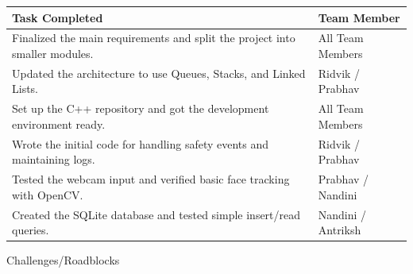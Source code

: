 \documentclass[12pt,a4paper]{article}
\newcommand{\sectiontitle}[1]{%
    {\color{GEUBlue}\fontsize{18}{22}\selectfont #1}%
}
\begin{document}
\noindent
\begin{tabularx}{\textwidth}{
    |>{\raggedright\arraybackslash}p{}
    |>{\raggedright\arraybackslash}X|
}
\hline
\textbf{Task Completed} & \textbf{Team Member}
\\
\hline
Finalized the main requirements and split the project into smaller modules.
& All Team Members
\\
\hline
Updated the architecture to use Queues, Stacks, and Linked Lists.
& Ridvik / Prabhav
\\
\hline
Set up the C++ repository and got the development environment ready.
& All Team Members
\\
\hline
Wrote the initial code for handling safety events and maintaining logs.
& Ridvik / Prabhav
\\
\hline
Tested the webcam input and verified basic face tracking with OpenCV.
& Prabhav / Nandini
\\
\hline
Created the SQLite database and tested simple insert/read queries.
& Nandini / Antriksh
\\
\hline
\end{tabularx}

\vspace{0.35cm}

\sectiontitle{Challenges/Roadblocks}

\vspace{0.20cm}
\end{document}
